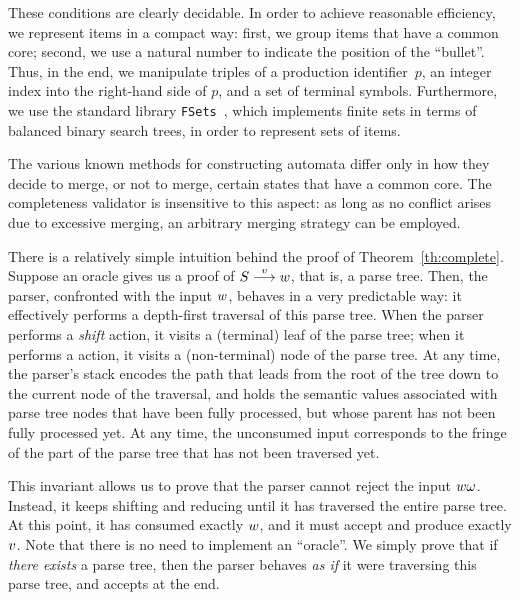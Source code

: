 \documentclass{llncs}
\begin{document}
These conditions are clearly decidable. In order to achieve reasonable
efficiency, we represent items in a compact way: first, we group items that
have a common \lrzero core; second, we use a natural number to indicate the
position of the ``bullet''. Thus, in the end, we manipulate triples of a
production identifier~$p$, an integer index into the right-hand side of $p$,
and a set of terminal symbols. Furthermore, we use the standard
library \texttt{FSets}~\cite{Filliatre-Letouzey-04}, which implements finite
sets in terms of balanced binary search trees, in order to represent sets of
items.

The various known methods for constructing \lrone automata differ only in how
they decide to merge, or not to merge, certain states that have a
common \lrzero core. The completeness validator is insensitive to this aspect:
as long as no conflict arises due to excessive merging, an arbitrary merging
strategy can be employed.



There is a relatively simple intuition behind the proof of
Theorem~\ref{th:complete}. Suppose an oracle gives us a proof of
$S\stackrel{v}{\longrightarrow}w$, that is, a parse tree. Then, the parser, confronted with
the input $w$, behaves in a very predictable way: it effectively performs
a depth-first traversal of this parse tree. When the parser performs
a \textit{shift} action, it visits a (terminal) leaf of the parse tree; when
it performs a  action, it visits a (non-terminal) node
of the parse tree. At any time, the parser's stack encodes the path that leads
from the root of the tree down
to the current node of the traversal, and holds the semantic values associated
with parse tree nodes that have been fully processed, but whose parent has not
been fully processed yet. At any time, the unconsumed input corresponds to the
fringe of the part of the parse tree that has not been traversed yet.

This invariant allows us to prove that the parser cannot reject the input
$w\omega$. Instead, it keeps shifting and reducing until it has traversed
the entire parse tree. At this point, it has consumed exactly $w$, and it
must accept and produce exactly $v$. Note that there is no need to implement
an ``oracle''. We simply prove that if \emph{there exists} a parse tree, then
the parser behaves \emph{as if} it were traversing this parse tree, and
accepts at the end.
\end{document}

